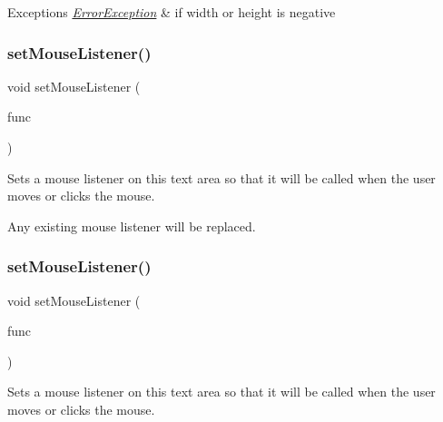 \begin{DoxyExceptions}{Exceptions}
{\em \mbox{\hyperlink{classErrorException}{Error\+Exception}}} & if width or height is negative \\
\hline
\end{DoxyExceptions}
\mbox{\label{classGTextArea_a37d8dbc943f59920f705b0104f60bde2}} 
\subsubsection{\texorpdfstring{set\+Mouse\+Listener()}{setMouseListener()}\hspace{0.1cm}{\footnotesize\ttfamily [1/2]}}
{\footnotesize\ttfamily void set\+Mouse\+Listener (\begin{DoxyParamCaption}\item[{G\+Event\+Listener}]{func }\end{DoxyParamCaption})\hspace{0.3cm}{\ttfamily [virtual]}}



Sets a mouse listener on this text area so that it will be called when the user moves or clicks the mouse. 

Any existing mouse listener will be replaced. \mbox{\label{classGTextArea_aea7f647ea62d59f71b5fad6aa65eeaf9}} 
\subsubsection{\texorpdfstring{set\+Mouse\+Listener()}{setMouseListener()}\hspace{0.1cm}{\footnotesize\ttfamily [2/2]}}
{\footnotesize\ttfamily void set\+Mouse\+Listener (\begin{DoxyParamCaption}\item[{G\+Event\+Listener\+Void}]{func }\end{DoxyParamCaption})\hspace{0.3cm}{\ttfamily [virtual]}}



Sets a mouse listener on this text area so that it will be called when the user moves or clicks the mouse. 

